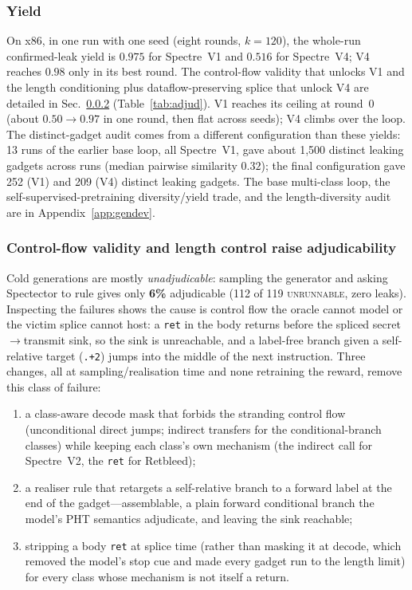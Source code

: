 \documentclass[conference]{IEEEtran}
\begin{document}
\subsubsection{Yield}
\label{sec:genyield}
On x86, in one run with one seed (eight rounds, $k{=}120$), the whole-run
confirmed-leak yield is $0.975$ for Spectre~V1 and $0.516$ for Spectre~V4; V4
reaches $0.98$ only in its best round. The control-flow validity that unlocks V1 and the
length conditioning plus dataflow-preserving splice that unlock V4 are detailed
in Sec.~\ref{sec:adjud} (Table~\ref{tab:adjud}). V1 reaches its ceiling at
round~0 (about $0.50\to0.97$ in one round, then flat across seeds); V4 climbs
over the loop. The distinct-gadget audit comes from a different configuration
than these yields: 13 runs of the earlier base loop, all Spectre~V1, gave
about 1{,}500 distinct leaking gadgets across runs (median pairwise similarity
$0.32$); the final configuration gave 252 (V1) and 209 (V4) distinct leaking
gadgets.
The base multi-class loop, the self-supervised-pretraining
diversity/yield trade, and the length-diversity audit are in
Appendix~\ref{app:gendev}.

\subsubsection{Control-flow validity and length control raise adjudicability}
\label{sec:adjud}

Cold generations are mostly \emph{unadjudicable}: sampling the generator and
asking Spectector to rule gives only \textbf{6\%} adjudicable
(112 of 119 \textsc{unrunnable}, zero leaks). Inspecting the failures shows the
cause is control flow the oracle cannot model or the victim splice cannot host:
a \texttt{ret} in the body returns before the spliced secret$\to$transmit sink,
so the sink is unreachable, and a label-free branch given a self-relative target
(\texttt{.+2}) jumps into the middle of the next instruction. Three changes, all
at sampling/realisation time and none retraining the reward, remove this class
of failure:
\begin{enumerate}[itemsep=1pt,leftmargin=1.4em]
  \item a class-aware decode mask that forbids the stranding control flow
    (unconditional direct jumps; indirect transfers for the conditional-branch
    classes) while keeping each class's own mechanism (the indirect call for
    Spectre~V2, the \texttt{ret} for Retbleed);
  \item a realiser rule that retargets a self-relative branch to a forward label
    at the end of the gadget---assemblable, a plain forward conditional branch
    the model's PHT semantics adjudicate, and leaving the sink reachable;
  \item stripping a body \texttt{ret} at splice time (rather than masking it at
    decode, which removed the model's stop cue and made every gadget run to the
    length limit) for every class whose mechanism is not itself a return.
\end{enumerate}
\end{document}
